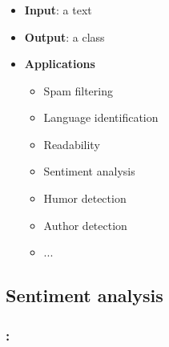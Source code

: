\documentclass[xcolor=table]{beamer}
\begin{document}
\begin{frame}
	\frametitle{\insertshortsubtitle}
	\framesubtitle{\insertsection}
	
	\begin{itemize}
		\item \textbf{Input}: a text
		\item \textbf{Output}: a class
		\item \textbf{Applications} 
		\begin{itemize}
			\item Spam filtering
			\item Language identification
			\item Readability
			\item Sentiment analysis
			\item Humor detection
			\item Author detection
			\item ...
		\end{itemize}
	\end{itemize}

\end{frame}

\subsection{Sentiment analysis}

\begin{frame}
	\frametitle{\insertshortsubtitle: \insertsection}
	\framesubtitle{\insertsubsection}
	
	
\end{frame}
\end{document}
